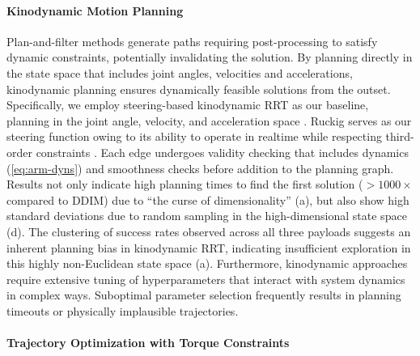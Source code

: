 \paragraph{Kinodynamic Motion Planning}
Plan-and-filter methods generate paths requiring post-processing to satisfy dynamic constraints, potentially invalidating the solution. By planning directly in the state space that includes joint angles, velocities and accelerations, kinodynamic planning ensures dynamically feasible solutions from the outset.
Specifically, we employ steering-based kinodynamic RRT as our baseline, planning in the joint angle, velocity, and acceleration space \cite{lavalle2001randomized}. Ruckig serves as our steering function owing to its ability to operate in realtime while respecting third-order constraints \cite{berscheid2021jerk}. Each edge undergoes validity checking that includes dynamics (\cref{eq:arm-dyns}) and smoothness checks before addition to the planning graph.
Results not only indicate high planning times to find the first solution ($>1000\times$ compared to DDIM) due to ``the curse of dimensionality'' (a), but also show high standard deviations due to random sampling in the high-dimensional state space (d).
The clustering of success rates observed across all three payloads suggests an inherent planning bias in kinodynamic RRT, indicating insufficient exploration in this highly non-Euclidean state space (a).
Furthermore, kinodynamic approaches require extensive tuning of hyperparameters that interact with system dynamics in complex ways. Suboptimal parameter selection frequently results in planning timeouts or physically implausible trajectories.

\vspace{-0.08in}
\paragraph{Trajectory Optimization with Torque Constraints}

